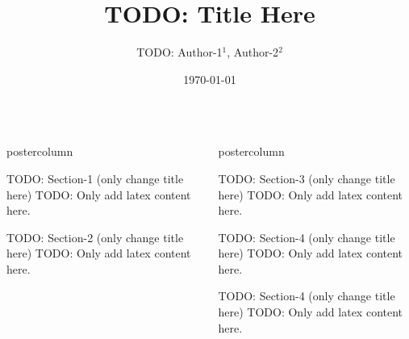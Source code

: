 \documentclass{beamer}
\title{\LARGE TODO: Title Here}
\author{TODO: Author-1$^{1}$, Author-2$^{2}$}
\institute[TODO: your institute]{
$^{1}$ TODO: affiliation-1 \\ 
$^{2}$ TODO: affiliation-2
}
\date{\today}
\newlength{\columnheight}
\begin{document}
\begin{frame}
\begin{columns}

\begin{column}{.43\textwidth}
\begin{beamercolorbox}[center]{postercolumn}
\begin{minipage}{.98\textwidth}
\parbox[t][\columnheight]{\textwidth}{

\begin{myblock}{TODO: Section-1 (only change title here)}
TODO: Only add latex content here.
\end{myblock}\vfill

\begin{myblock}{TODO: Section-2 (only change title here)}
TODO: Only add latex content here.
\end{myblock}\vfill

}\end{minipage}\end{beamercolorbox}
\end{column}

\begin{column}{.57\textwidth}
\begin{beamercolorbox}[center]{postercolumn}
\begin{minipage}{.98\textwidth}
\parbox[t][\columnheight]{\textwidth}{

\begin{myblock}{TODO: Section-3 (only change title here)}
TODO: Only add latex content here.
\end{myblock}\vfill

\begin{myblock}{TODO: Section-4 (only change title here)}
TODO: Only add latex content here.
\end{myblock}\vfill

\begin{myblock}{TODO: Section-4 (only change title here)}
TODO: Only add latex content here.
\end{myblock}\vfill

}
\end{minipage}
\end{beamercolorbox}
\end{column}
\end{columns}
\end{frame}
\end{document}
